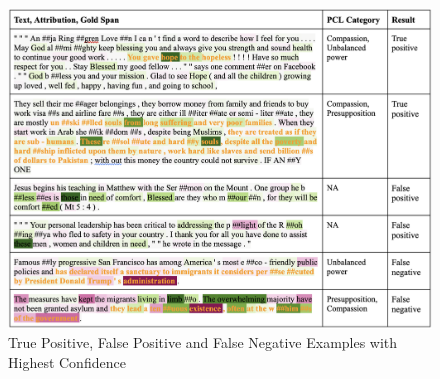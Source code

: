 \documentclass[11pt]{article}
\begin{document}
\label{sec:appendix}

\begin{figure}[t]
    \centering
    \includegraphics[width=16cm]{Fig 2.png}
    \caption{True Positive, False Positive and False Negative Examples with Highest Confidence}
    \label{fig:fig2}
\end{figure}
\end{document}
